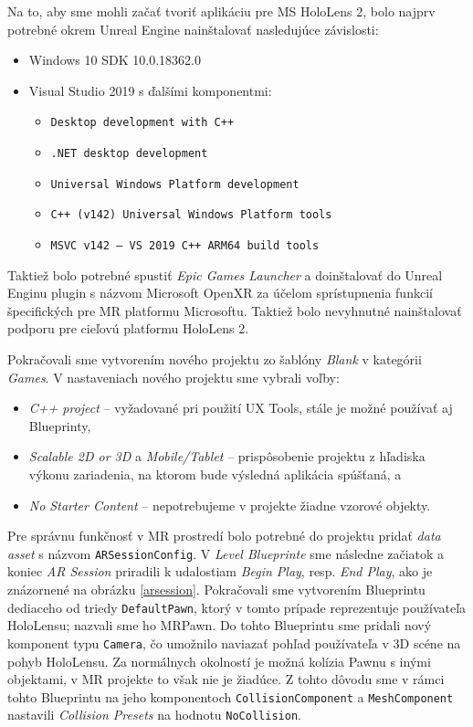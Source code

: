 Na to, aby sme mohli začať tvoriť aplikáciu pre MS HoloLens 2, bolo najprv potrebné okrem Unreal Engine nainštalovať nasledujúce závislosti:
\begin{itemize}
  \item Windows 10 SDK 10.0.18362.0
  \item Visual Studio 2019 s ďalšími komponentmi:
  \begin{itemize}    
    \item \texttt{Desktop development with C++}
    \item \texttt{.NET desktop development}
    \item \texttt{Universal Windows Platform development}
    \item \texttt{C++ (v142) Universal Windows Platform tools}
    \item \texttt{MSVC v142 {--} VS 2019 C++ ARM64 build tools}    
  \end{itemize}
\end{itemize}

Taktiež bolo potrebné spustiť \emph{Epic Games Launcher} a doinštalovať do Unreal Enginu plugin s názvom Microsoft OpenXR za účelom sprístupnenia funkcií špecifických pre MR platformu Microsoftu. Taktiež bolo nevyhnutné
nainštalovať podporu pre cieľovú platformu HoloLens 2. 

Pokračovali sme vytvorením nového projektu zo šablóny \emph{Blank} v kategórii \emph{Games}. V nastaveniach nového projektu sme vybrali voľby:
\begin{itemize}
  \item \emph{C++ project} {--} vyžadované pri použití UX Tools, stále je možné používať aj Blueprinty,
  \item \emph{Scalable 2D or 3D} a \emph{Mobile/Tablet} {--} prispôsobenie projektu z hľadiska výkonu zariadenia, na ktorom bude výsledná aplikácia spúšťaná, a
  \item \emph{No Starter Content} {--} nepotrebujeme v projekte žiadne vzorové objekty.
\end{itemize}

Pre správnu funkčnosť v MR prostredí bolo potrebné do projektu pridať \emph{data asset} s názvom \texttt{ARSessionConfig}. V \emph{Level Blueprinte} sme následne začiatok a koniec \emph{AR Session}
priradili k udalostiam \emph{Begin Play}, resp. \emph{End Play}, ako je znázornené na obrázku \ref{arsession}.
Pokračovali sme vytvorením Blueprintu dediaceho od triedy \texttt{DefaultPawn}, ktorý v tomto prípade reprezentuje používateľa HoloLensu; nazvali sme ho MRPawn.
Do tohto Blueprintu sme pridali nový komponent typu
\texttt{Camera}, čo umožnilo naviazať pohľad používateľa v 3D scéne na pohyb HoloLensu. Za normálnych okolností je možná kolízia Pawnu s inými objektami, v MR projekte to však nie je žiadúce.
Z tohto dôvodu sme v rámci tohto Blueprintu na jeho komponentoch \texttt{CollisionComponent} a \texttt{MeshComponent} nastavili \emph{Collision Presets} na hodnotu \texttt{NoCollision}. 

